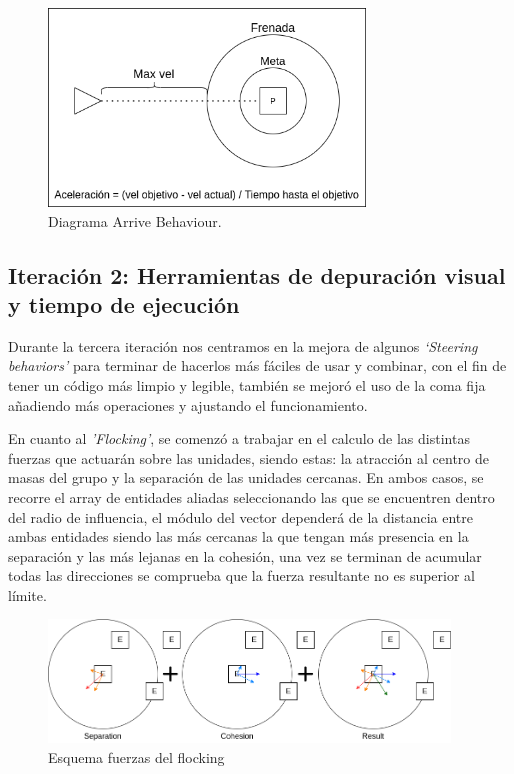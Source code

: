 \begin{figure}[htb]
\centering
\includegraphics[width=0.75\textwidth]{imagenes/diario_desarrollo/arrive_b.png}
\caption{Diagrama Arrive Behaviour.}
\label{fig:arrive_b}
\end{figure} 

\subsection*{Iteración 2: Herramientas de depuración visual y tiempo de ejecución}
Durante la tercera iteración nos centramos en la mejora de algunos \textit{`Steering behaviors'}
para terminar de hacerlos más fáciles de usar y combinar, con el fin de tener un código más 
limpio y legible, también se mejoró el uso de la coma fija añadiendo más operaciones y ajustando
el funcionamiento.

En cuanto al \textit{'Flocking'}, se comenzó a trabajar en el calculo de las distintas fuerzas que
actuarán sobre las unidades, siendo estas: la atracción al centro de masas del grupo y la separación
de las unidades cercanas. En ambos casos, se recorre el array de entidades aliadas seleccionando las
que se encuentren dentro del radio de influencia, el módulo del vector dependerá de la distancia entre
ambas entidades siendo las más cercanas la que tengan más presencia en la separación y las más lejanas 
en la cohesión, una vez se terminan de acumular todas las direcciones se comprueba que la fuerza 
resultante no es superior al límite.

\begin{figure}[ht]
\centering
\includegraphics[width=0.95\textwidth]{imagenes/diario_desarrollo/flocking.png}
\caption{Esquema fuerzas del flocking}
\label{fig:fuerzas_flocking}
\end{figure}

